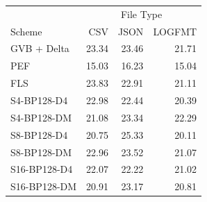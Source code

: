 \begin{tabular}{lrrr}
\toprule
 & \multicolumn{3}{c}{File Type} \\
Scheme & CSV & JSON & LOGFMT \\
\midrule
GVB + Delta & 23.34 & 23.46 & 21.71 \\
PEF & 15.03 & 16.23 & 15.04 \\
FLS & 23.83 & 22.91 & 21.11 \\
S4-BP128-D4 & 22.98 & 22.44 & 20.39 \\
S4-BP128-DM & 21.08 & 23.34 & 22.29 \\
S8-BP128-D4 & 20.75 & 25.33 & 20.11 \\
S8-BP128-DM & 22.96 & 23.52 & 21.07 \\
S16-BP128-D4 & 22.07 & 22.22 & 21.02 \\
S16-BP128-DM & 20.91 & 23.17 & 20.81 \\
\bottomrule
\end{tabular}
